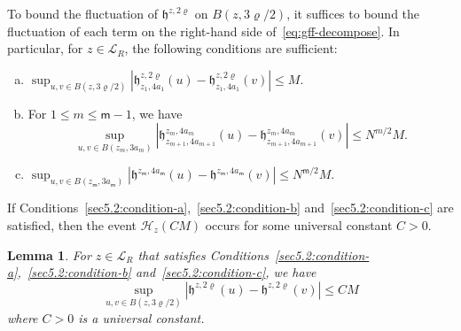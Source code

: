 \documentclass[a4paper]{article}
\numberwithin{equation}{section}
\newtheorem{lemma}[theorem]{Lemma}
\numberwithin{equation}{section}
\renewcommand{\1}{\mathbf{1}}
\begin{document}
To bound the fluctuation of $\mathfrak h^{z,2\varrho}$ on $B(z,3\varrho/2)$, it suffices to bound the fluctuation of each term on the right-hand side of~\eqref{eq:gff-decompose}. In particular, for $z \in \mathscr{L}_R$, the following conditions are sufficient:
\begin{enumerate}[(a)]
    \item $\sup_{u,v \in B(z,3\varrho/2)} |\mathfrak h^{z,2\varrho}_{z_1, 4a_1}(u) - \mathfrak h^{z,2\varrho}_{z_1, 4a_1}(v)| \leq M$. \label{sec5.2:condition-a}

    \item For $1 \leq m \leq \mathsf m - 1$, we have $$\sup_{u,v \in B(z_m, 3a_m)} |\mathfrak h^{z_m, 4a_m}_{z_{m+1}, 4a_{m+1}}(u) - \mathfrak h^{z_m, 4a_m}_{z_{m+1}, 4a_{m+1}}(v)| \leq N^{m/2} M.$$ \label{sec5.2:condition-b}

    \item $\sup_{u,v \in B(z_{\mathsf m}, 3 a_{\mathsf m})} |\mathfrak h^{z_{\mathsf m}, 4 a_{\mathsf m}}(u) - \mathfrak h^{z_{\mathsf m}, 4 a_{\mathsf m}}(v)| \leq N^{\mathsf m/2} M$. \label{sec5.2:condition-c}
\end{enumerate}

If Conditions~\eqref{sec5.2:condition-a},~\eqref{sec5.2:condition-b} and~\eqref{sec5.2:condition-c} are satisfied, then the event $\mathcal{H}_z(CM)$ occurs for some universal constant $C>0$.

\begin{lemma}\label{lem:nice-fluct}
    For $z \in \mathscr{L}_R$ that satisfies Conditions~\eqref{sec5.2:condition-a},~\eqref{sec5.2:condition-b} and~\eqref{sec5.2:condition-c}, we have 
    $$
    \sup_{u,v \in B(z, 3\varrho/2)} | \mathfrak h^{z, 2\varrho} (u) - \mathfrak h^{z, 2\varrho} (v)| \leq CM
    $$
    where $C>0$ is a universal constant.
\end{lemma}
\end{document}
